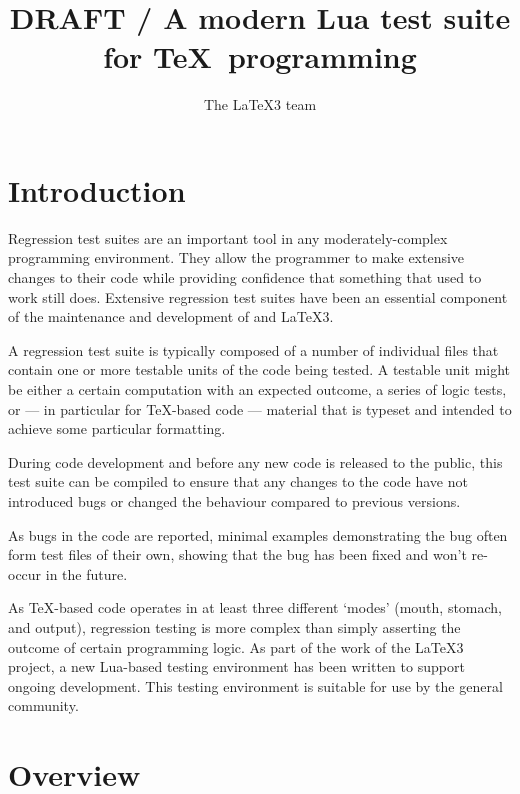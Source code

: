 \documentclass[a4paper]{ltugboat}
\begin{document}
\title{DRAFT / A modern Lua test suite for \TeX\ programming}
\author{The \LaTeX3 team}

\newcommand\drivername{build.lua}
\newcommand\makename{l3make.lua}
\newcommand\execname{texlua \makename}
\newcommand\compdirname{test/}

\maketitle

\section{Introduction}

Regression test suites are an important tool in any moderately-complex programming environment.
They allow the programmer to make extensive changes to their code while providing confidence that something that used to work still does.
Extensive regression test suites have been an essential component of the maintenance and development of \LaTeXe{} and \LaTeX3.

A regression test suite is typically composed of a number of individual files that contain one or more testable units of the code being tested. A testable unit might be either a certain computation with an expected outcome, a series of logic tests, or --- in particular for \TeX{}-based code --- material that is typeset and intended to achieve some particular formatting.

During code development and before any new code is released to the public, this test suite can be compiled to ensure that any changes to the code have not introduced bugs or changed the behaviour compared to previous versions.

As bugs in the code are reported, minimal examples demonstrating the bug often form test files of their own, showing that the bug has been fixed and won't re-occur in the future.

As \TeX{}-based code operates in at least three different `modes' (mouth, stomach, and output), regression testing is more complex than simply asserting the outcome of certain programming logic.
As part of the work of the \LaTeX3 project, a new Lua-based testing environment has been written to support ongoing development.
This testing environment is suitable for use by the general community.

\section{Overview}
\label{sec:overview}
\end{document}
